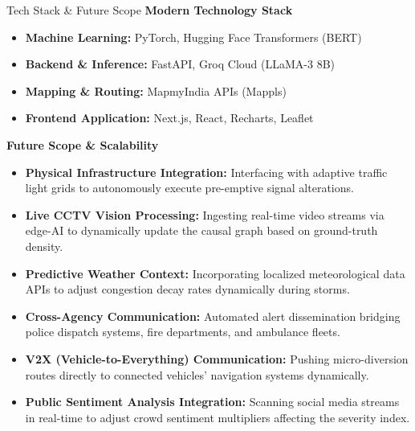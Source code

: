 \documentclass[aspectratio=169]{beamer}
\begin{document}
\begin{frame}{Tech Stack \& Future Scope}
    \textbf{Modern Technology Stack}
    \begin{itemize}
        \item \textbf{Machine Learning:} PyTorch, Hugging Face Transformers (BERT)
        \item \textbf{Backend \& Inference:} FastAPI, Groq Cloud (LLaMA-3 8B)
        \item \textbf{Mapping \& Routing:} MapmyIndia APIs (Mappls)
        \item \textbf{Frontend Application:} Next.js, React, Recharts, Leaflet
    \end{itemize}
    
    \vspace{1em}
    \textbf{Future Scope \& Scalability}
    \begin{itemize}
        \item \textbf{Physical Infrastructure Integration:} Interfacing with adaptive traffic light grids to autonomously execute pre-emptive signal alterations.
        \item \textbf{Live CCTV Vision Processing:} Ingesting real-time video streams via edge-AI to dynamically update the causal graph based on ground-truth density.
        \item \textbf{Predictive Weather Context:} Incorporating localized meteorological data APIs to adjust congestion decay rates dynamically during storms.
        \item \textbf{Cross-Agency Communication:} Automated alert dissemination bridging police dispatch systems, fire departments, and ambulance fleets.
        \item \textbf{V2X (Vehicle-to-Everything) Communication:} Pushing micro-diversion routes directly to connected vehicles' navigation systems dynamically.
        \item \textbf{Public Sentiment Analysis Integration:} Scanning social media streams in real-time to adjust crowd sentiment multipliers affecting the severity index.
    \end{itemize}
\end{frame}
\end{document}
